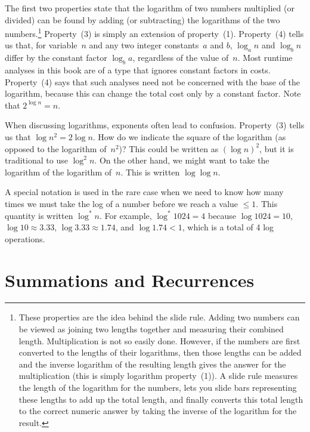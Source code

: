 The first two properties state that the logarithm
of two numbers multiplied (or divided) can be found by adding
(or subtracting) the logarithms of the two numbers.\footnote{
These properties are the idea behind the slide rule.
Adding two numbers can be viewed as joining two lengths
together and measuring their combined length.
Multiplication is not so easily done.
However, if the numbers are first converted to the lengths of their
logarithms, then those lengths can be added and the inverse logarithm
of the resulting length gives the answer for the multiplication
(this is simply logarithm property~(1)).
A slide rule measures the length of the logarithm for the numbers,
lets you slide bars representing these lengths to add up the total
length, and finally converts this total length to the correct numeric
answer by taking the inverse of the logarithm for the result.
}
Property~(3) is simply an extension of property~(1).
Property~(4) tells us that, for variable~\(n\) and any two integer
constants~\(a\) and \(b\), \(\log_a n\) and \(\log_b n\) differ by the
constant factor \(\log_b a\), regardless of the value of~\(n\).
Most runtime analyses in this book are of a type that ignores
constant factors in costs.
Property~(4) says that such analyses need not be concerned with the
base of the logarithm, because this can change the total cost only by a
constant factor.
Note that \(2^{\log n} = n\).

When discussing logarithms, exponents often lead to confusion.
Property~(3) tells us that \(\log n^2 = 2 \log n\).
How do we indicate the square of the logarithm (as opposed to the
logarithm of~\(n^2\))?
This could be written as \((\log n)^2\), but it is traditional to use
\(\log^2 n\).
On the other hand, we might want to take the logarithm of the
logarithm of~\(n\).
This is written \(\log \log n\).

A special notation is used in the rare case when we need to know how
many times we must take the log of a number before we reach a
value \(\leq 1\).
This quantity is written \(\log^* n\).
For example, \(\log^* 1024 = 4\) because
\(\log 1024 = 10\), \(\log 10 \approx 3.33\), \(\log 3.33 \approx 1.74\),
and \(\log 1.74 < 1\), which is a total of 4 log operations.

\section{Summations and Recurrences}
\label{Sum}

